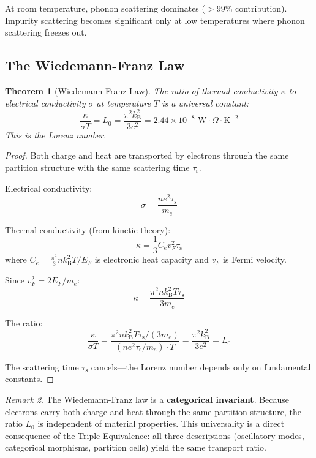 \documentclass[twocolumn,10pt]{article}
\newtheorem{theorem}{Theorem}[section]
\theoremstyle{definition}
\theoremstyle{remark}
\newtheorem{remark}[theorem]{Remark}
\newcommand{\kB}{k_{\mathrm{B}}}
\newcommand{\taus}{\tau_{\mathrm{s}}}
\begin{document}
At room temperature, phonon scattering dominates ($>99\%$ contribution). Impurity scattering becomes significant only at low temperatures where phonon scattering freezes out.

\subsection{The Wiedemann-Franz Law}

\begin{theorem}[Wiedemann-Franz Law]
\label{thm:wiedemann_franz}
The ratio of thermal conductivity $\kappa$ to electrical conductivity $\sigma$ at temperature $T$ is a universal constant:
\begin{equation}
\boxed{\frac{\kappa}{\sigma T} = L_0 = \frac{\pi^2 \kB^2}{3e^2} = 2.44 \times 10^{-8} \text{ W}\cdot\Omega\cdot\text{K}^{-2}}
\end{equation}
This is the Lorenz number.
\end{theorem}

\begin{proof}
Both charge and heat are transported by electrons through the same partition structure with the same scattering time $\taus$.

Electrical conductivity:
\begin{equation}
\sigma = \frac{ne^2\taus}{m_e}
\end{equation}

Thermal conductivity (from kinetic theory):
\begin{equation}
\kappa = \frac{1}{3}C_e v_F^2 \taus
\end{equation}
where $C_e = \frac{\pi^2}{3}n\kB^2 T/E_F$ is electronic heat capacity and $v_F$ is Fermi velocity.

Since $v_F^2 = 2E_F/m_e$:
\begin{equation}
\kappa = \frac{\pi^2 n\kB^2 T \taus}{3m_e}
\end{equation}

The ratio:
\begin{equation}
\frac{\kappa}{\sigma T} = \frac{\pi^2 n\kB^2 T \taus / (3m_e)}{(ne^2\taus/m_e) \cdot T} = \frac{\pi^2 \kB^2}{3e^2} = L_0
\end{equation}

The scattering time $\taus$ cancels---the Lorenz number depends only on fundamental constants.
\end{proof}

\begin{remark}
The Wiedemann-Franz law is a \textbf{categorical invariant}. Because electrons carry both charge and heat through the same partition structure, the ratio $L_0$ is independent of material properties. This universality is a direct consequence of the Triple Equivalence: all three descriptions (oscillatory modes, categorical morphisms, partition cells) yield the same transport ratio.
\end{remark}
\end{document}

